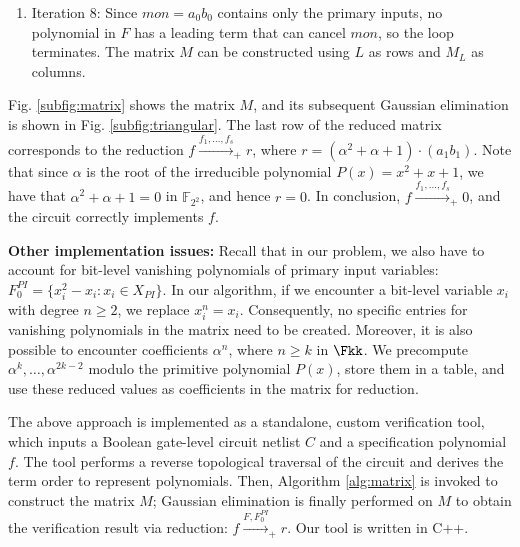 \begin{Example}
{\begin{enumerate}
\item Iteration 8: Since $mon = a_0b_0$ contains only the
  primary inputs, no polynomial in $F$ has a leading term that can
  cancel $mon$, so the loop terminates. The matrix $M$ can be
  constructed using $L$ as rows and $M_L$ as columns.

\end{enumerate}

Fig. \ref{subfig:matrix} shows the matrix $M$, and its subsequent
Gaussian elimination is shown in Fig. \ref{subfig:triangular}. The
last row of the reduced matrix corresponds to the reduction
$f\stackrel{f_1, \dots,   f_s}{\longrightarrow}_+r$, where $r =
(\alpha^2 + \alpha + 1)\cdot (a_1b_1)$. Note that since $\alpha$ is the
root of the irreducible polynomial $P(x) = x^2 + x + 1$, we have that
$\alpha^2 + \alpha + 1 = 0$ in ${\mathbb{F}}_{2^2}$, and hence $r =
0$. In conclusion, $f\stackrel{f_1, \dots,
  f_s}{\longrightarrow}_+0$, and the circuit correctly implements
$f$. 
}
\end{Example}


{\bf Other implementation issues:} Recall that in our problem, we also
have to account for bit-level vanishing polynomials of primary input 
variables: $F_0^{PI} = \{x_i^2 - x_i: x_i \in X_{PI}\}$. In our
algorithm, if we encounter a bit-level variable $x_i$ with degree $n
\geq 2$, we replace $x_i^n = x_i$. Consequently, no specific entries 
for vanishing polynomials in the matrix need to be created. Moreover,
it is also possible to encounter coefficients $\alpha^n$, where $n
\geq k$ in $\Fkk$. We precompute $\alpha^k, \dots, \alpha^{2k-2}$
modulo the primitive polynomial $P(x)$, store them in a table, and use
these reduced values as coefficients in the matrix for reduction.   


The above approach is implemented as a standalone, custom verification
tool, which inputs a Boolean gate-level circuit netlist $C$ and a
specification polynomial $f$. The tool performs a reverse topological
traversal of the circuit and derives the term order to represent
polynomials. Then, Algorithm \ref{alg:matrix} is invoked to construct
the matrix $M$; Gaussian elimination is finally performed on $M$ to
obtain the verification result via reduction:
$f\stackrel{F,F_0^{PI}}{\longrightarrow}_+r$. Our tool is written in
C++.  
